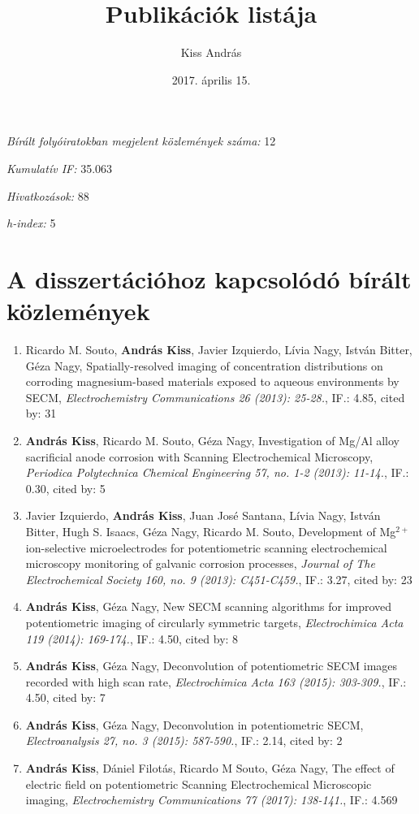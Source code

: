 \documentclass[11pt,a4paper,roman]{article}
\date{2017. április 15.}
\title{Publikációk listája}
\author{Kiss András}
\begin{document}
\maketitle

\begin{center}
\emph{Bírált folyóiratokban megjelent közlemények száma:} 12

\emph{Kumulatív IF:} 35.063

\emph{Hivatkozások:} 88

\emph{h-index:} 5
\end{center}

\section{A disszertációhoz kapcsolódó bírált közlemények}
\begin{enumerate}

\item Ricardo M. Souto, \textbf{András Kiss}, Javier Izquierdo, Lívia Nagy, István Bitter, Géza Nagy, Spatially-resolved imaging of concentration distributions on corroding mag\-ne\-si\-um-based materials exposed to aqueous environments by SECM, \emph{Electrochemistry Communications 26 (2013): 25-28.}, IF.: 4.85, cited by: 31

\item \textbf{András Kiss}, Ricardo M. Souto, Géza Nagy, Investigation of Mg/Al alloy sacrificial anode corrosion with Scanning Electrochemical Microscopy, \emph{Periodica Polytechnica Chemical Engineering 57, no. 1-2 (2013): 11-14.}, IF.: 0.30, cited by: 5

\item Javier Izquierdo, \textbf{András Kiss}, Juan José Santana, Lívia Nagy, István Bitter, Hugh S. Isaacs, Géza Nagy, Ricardo M. Souto, Development of Mg$^{2+}$ ion-selective microelectrodes for potentiometric scanning electrochemical microscopy monitoring of galvanic corrosion processes, \emph{Journal of The Electrochemical Society 160, no. 9 (2013): C451-C459.}, IF.: 3.27, cited by: 23

\item \textbf{András Kiss}, Géza Nagy, New SECM scanning algorithms for improved potentiometric imaging of circularly symmetric targets, \emph{Electrochimica Acta 119 (2014): 169-174.}, IF.: 4.50, cited by: 8

\item \textbf{András Kiss}, Géza Nagy, Deconvolution of potentiometric SECM images recorded with high scan rate, \emph{Electrochimica Acta 163 (2015): 303-309.}, IF.: 4.50, cited by: 7

\item \textbf{András Kiss}, Géza Nagy, Deconvolution in potentiometric SECM, \emph{Electroanalysis 27, no. 3 (2015): 587-590.}, IF.: 2.14, cited by: 2


\item \textbf{András Kiss}, Dániel Filotás, Ricardo M Souto, Géza Nagy, The effect of electric field on potentiometric Scanning Electrochemical Microscopic imaging, \emph{Electrochemistry Communications 77 (2017): 138-141.}, IF.: 4.569
\end{enumerate}
\end{document}
